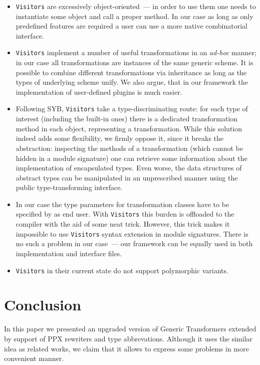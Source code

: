\documentclass[twocolumn,8pt]{extarticle}
\newcommand{\cd}[1]{\texttt{#1}}
\begin{document}
\begin{itemize}
   \item \cd{Visitors} are excessively object-oriented~--- in order to use them one needs to instantiate some object and call a proper method. In our case as long as
     only predefined features are required a user can use a more native combinatorial interface.
     
   \item \cd{Visitors} implement a number of useful transformations in an \emph{ad-hoc} manner; in our case all transformations are instances of the
     same generic scheme. It is possible to combine different transformations via inheritance as long as the types of underlying scheme unify. We also argue, that
     in our framework the implementation of user-defined plugins is much easier.
     
   \item Following SYB, \cd{Visitors} take a type-discriminating route: for each type of interest (including the built-in ones) there is a dedicated
     transformation method in each object, representing a transformation. While this solution indeed adds some flexibility, we firmly oppose it, since it
     breaks the abstraction: inspecting the methods of a transformation (which cannot be hidden in a module signature) one can retrieve some
     information about the implementation of encapsulated types. Even worse, the data structures of abstract types can be manipulated in an unprescribed
     manner using the public type-transforming interface.

   \item In our case the type parameters for transformation classes have to be specified by as end user. With \cd{Visitors} this burden is offloaded to the
     compiler with the aid of some neat trick. However, this trick makes it impossible to use \cd{Visitors} syntax extension in module signatures. There is no
     such a problem in our case~--- our framework can be equally used in both implementation and interface files.

   \item \cd{Visitors} in their current state do not support polymorphic variants.
\end{itemize}

\section{Conclusion}
In this paper we presented an upgraded version of Generic Transformers extended by support of PPX rewriters and type abbrevations. Although it 
uses the similar idea as related works, we claim that it allows to express some problems in more convenient manner.
\end{document}
